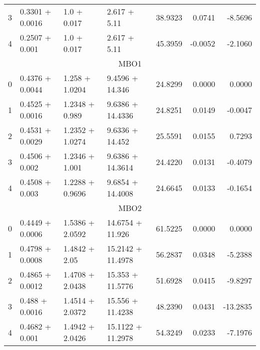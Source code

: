 \begin{tabular}{llllrrr}
3 &  0.3301 + 0.0016 &   1.0 + 0.017 &    2.617 + 5.11 &             38.9323 &                 0.0741 &        -8.5696 \\
4 &   0.2507 + 0.001 &   1.0 + 0.017 &    2.617 + 5.11 &             45.3959 &                -0.0052 &        -2.1060 \\
\midrule
\multicolumn{7}{c}{MBO1} \\
\midrule
0 &  0.4376 + 0.0044 &   1.258 + 1.0204 &   9.4596 + 14.346 &             24.8299 &                 0.0000 &         0.0000 \\
1 &  0.4525 + 0.0016 &   1.2348 + 0.989 &  9.6386 + 14.4336 &             24.8251 &                 0.0149 &        -0.0047 \\
2 &  0.4531 + 0.0029 &  1.2352 + 1.0274 &   9.6336 + 14.452 &             25.5591 &                 0.0155 &         0.7293 \\
3 &   0.4506 + 0.002 &   1.2346 + 1.001 &  9.6386 + 14.3614 &             24.4220 &                 0.0131 &        -0.4079 \\
4 &   0.4508 + 0.003 &  1.2288 + 0.9696 &  9.6854 + 14.4008 &             24.6645 &                 0.0133 &        -0.1654 \\
\midrule
\multicolumn{7}{c}{MBO2} \\
\midrule
0 &  0.4449 + 0.0006 &  1.5386 + 2.0592 &   14.6754 + 11.926 &             61.5225 &                 0.0000 &         0.0000 \\
1 &  0.4798 + 0.0008 &    1.4842 + 2.05 &  15.2142 + 11.4978 &             56.2837 &                 0.0348 &        -5.2388 \\
2 &  0.4865 + 0.0012 &  1.4708 + 2.0438 &   15.353 + 11.5776 &             51.6928 &                 0.0415 &        -9.8297 \\
3 &   0.488 + 0.0016 &  1.4514 + 2.0372 &   15.556 + 11.4238 &             48.2390 &                 0.0431 &       -13.2835 \\
4 &   0.4682 + 0.001 &  1.4942 + 2.0426 &  15.1122 + 11.2978 &             54.3249 &                 0.0233 &        -7.1976 \\
\bottomrule
\end{tabular}
